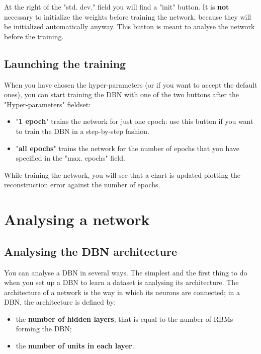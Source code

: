 \documentclass[a4paper]{article}
\begin{document}
		
At the right of the "std. dev." field you will find a "init" button. It is \textbf{not} necessary to initialize the weights before training the network, because they will be initialized automatically anyway. This button is meant to analyse the network before the training.

		
	\subsection{Launching the training}

		
When you have chosen the hyper-parameters (or if you want to accept the default ones), you can start training the DBN with one of the two buttons after the "Hyper-parameters" fieldset:
		
	\begin{itemize}
		
			
	\item "\textbf{1 epoch}" trains the network for just one epoch: use this button if you want to train the DBN in a step-by-step fashion.
			
	\item "\textbf{all epochs}" trains the network for the number of epochs that you have specified in the "max. epochs" field.
		
	\end{itemize}

		
While training the network, you will see that a chart is updated plotting the reconstruction error against the number of epochs.
	


		
	\section{Analysing a network}


		
	\subsection{Analysing the DBN architecture}

		
You can analyse a DBN in several ways. The simplest and the first thing to do when you set up a DBN to learn a dataset is analysing its architecture. The architecture of a network is the way in which its neurons are connected; in a DBN, the architecture is defined by:
		
	\begin{itemize}
		
			
	\item the \textbf{number of hidden layers}, that is equal to the number of RBMs forming the DBN;
			
	\item the \textbf{number of units in each layer}.
		
	\end{itemize}
\end{document}
